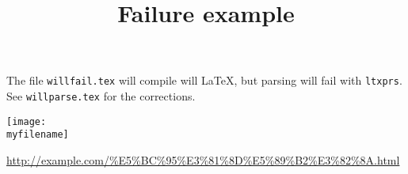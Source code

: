 \documentclass[french]{article}
\newcommand{\myfilename}{"$HOME/toto.png"}
\newcommand{\myurl}{\url{http://example.com/\%E5\%BC\%95\%E3\%81\%8D\%E5\%89\%B2\%E3\%82\%8A.html}}
\begin{document}
\title{Failure example}
The file \texttt{willfail.tex} will compile will \LaTeX, but parsing will fail with \texttt{ltxprs}.
See \texttt{willparse.tex} for the corrections. 




\texttt{[image: \\myfilename]}

\myurl

\end{document}
